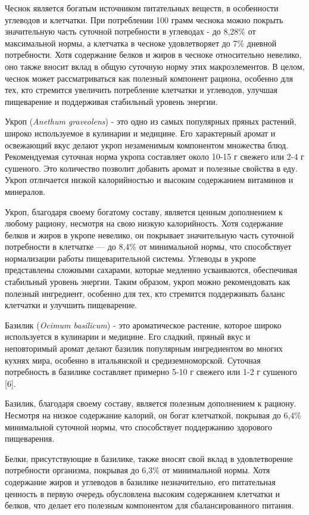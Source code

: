 \begin{multicols}{2}
Чеснок является богатым источником питательных веществ, в особенности
углеводов и клетчатки. При потреблении 100 грамм чеснока можно покрыть
значительную часть суточной потребности в углеводах - до 8,28\% от
максимальной нормы, а клетчатка в чесноке удовлетворяет до 7\% дневной
потребности. Хотя содержание белков и жиров в чесноке относительно
невелико, оно также вносит вклад в общую суточную норму этих
макроэлементов. В целом, чеснок может рассматриваться как полезный
компонент рациона, особенно для тех, кто стремится увеличить потребление
клетчатки и углеводов, улучшая пищеварение и поддерживая стабильный
уровень энергии.

Укроп (\emph{Anethum graveolens}) - это одно из самых популярных пряных
растений, широко используемое в кулинарии и медицине. Его характерный
аромат и освежающий вкус делают укроп незаменимым компонентом множества
блюд. Рекомендуемая суточная норма укропа составляет около 10-15 г
свежего или 2-4 г сушеного. Это количество позволит добавить аромат и
полезные свойства в еду. Укроп отличается низкой калорийностью и высоким
содержанием витаминов и минералов.

Укроп, благодаря своему богатому составу, является ценным дополнением к
любому рациону, несмотря на свою низкую калорийность. Хотя содержание
белков и жиров в укропе невелико, он покрывает значительную часть
суточной потребности в клетчатке --- до 8,4\% от минимальной нормы, что
способствует нормализации работы пищеварительной системы. Углеводы в
укропе представлены сложными сахарами, которые медленно усваиваются,
обеспечивая стабильный уровень энергии. Таким образом, укроп можно
рекомендовать как полезный ингредиент, особенно для тех, кто стремится
поддерживать баланс клетчатки и улучшить пищеварение.

Базилик (\emph{Ocimum basilicum}) - это ароматическое растение, которое
широко используется в кулинарии и медицине. Его сладкий, пряный вкус и
неповторимый аромат делают базилик популярным ингредиентом во многих
кухнях мира, особенно в итальянской и средиземноморской. Суточная
потребность в базилике составляет примерно 5-10 г свежего или 1-2 г
сушеного {[}6{]}.

Базилик, благодаря своему составу, является полезным дополнением к
рациону. Несмотря на низкое содержание калорий, он богат клетчаткой,
покрывая до 6,4\% минимальной суточной нормы, что способствует
поддержанию здорового пищеварения.

Белки, присутствующие в базилике, также вносят свой вклад в
удовлетворение потребности организма, покрывая до 6,3\% от минимальной
нормы. Хотя содержание жиров и углеводов в базилике незначительно, его
питательная ценность в первую очередь обусловлена высоким содержанием
клетчатки и белков, что делает его полезным компонентом для
сбалансированного питания\emph{.}


\end{multicols}
